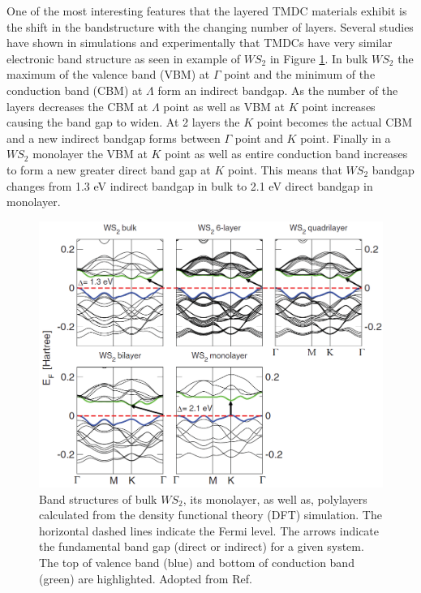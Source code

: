 	One of the most interesting features that the layered TMDC materials exhibit is the shift in the bandstructure with the changing number of layers. Several studies have shown in simulations and experimentally that TMDCs have very similar electronic band structure as seen in example of $WS_2$ in Figure \ref{fig:WS2BandStructureSimulation}. In bulk $WS_2$ the maximum of the valence band (VBM) at $\Gamma$ point and the minimum of the conduction band (CBM) at $\Lambda$ form an indirect bandgap. As the number of the layers decreases the CBM at $\Lambda$ point as well as VBM at $K$ point increases causing the band gap to widen. At 2 layers the $K$ point becomes the actual CBM and a new indirect bandgap forms between $\Gamma$ point and $K$ point. Finally in a $WS_2$ monolayer the VBM at $K$ point as well as entire conduction band increases to form a new greater direct band gap at $K$ point. This means that $WS_2$ bandgap changes from 1.3 eV indirect bandgap in bulk to 2.1 eV direct bandgap in monolayer.
	
	\begin{figure}[h]
	\begin{center}
	\includegraphics[scale=0.4]{WS2BandStructureSimulation.png}
	\caption{Band structures of bulk $WS_2$, its monolayer, as well as, polylayers calculated from the density functional theory (DFT) simulation. The horizontal dashed lines indicate the Fermi level. The arrows indicate the fundamental band gap (direct or indirect) for a given system. The top of valence band (blue) and bottom of conduction band (green) are highlighted. Adopted from Ref. \cite{WS2BandStructureSimulation}}
	\label{fig:WS2BandStructureSimulation}
	\end{center}
	\end{figure}
	
